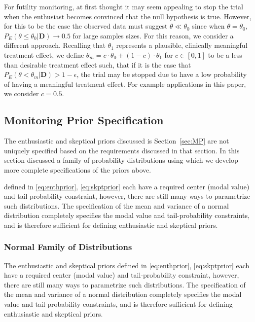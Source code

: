 \documentclass[12pt]{article}
\begin{document}
For futility monitoring, at first thought it may seem appealing to stop the trial when the enthusiast becomes convinced that the
null hypothesis is true. 
%
However, for this to be the case the observed data must suggest $\theta \ll \theta_0$ since when $\theta=\theta_0$,
$P_E(\theta\le\theta_0| \mathbf{D}) \rightarrow 0.5$ for large samples sizes.
%
For this reason, we consider a different approach.
%
Recalling that $\theta_1$ represents a plausible, clinically meaningful treatment effect, we define $\theta_{m}= c \cdot \theta_0 + (1-c) \cdot \theta_1$ for 
$c \in [0,1]$ to be a less than desirable treatment effect such, that if it is the case that $P_E\left(\theta<\theta_{m}\Big| \mathbf{D}\right)>1-\epsilon$, 
the trial may be stopped due to have a low probability of having a meaningful treatment effect.
%
For example applications in this paper, we consider $c=0.5$.

\subsection{Monitoring Prior Specification}

The enthusiastic and skeptical priors discussed is Section~\ref{sec:MP} are not uniquely specified based on the requirements discussed in that section. 
%
In this section discussed a family of probability distributions using which we develop more complete 
specifications of the priors above.


defined in \eqref{eq:enthprior}, \eqref{eq:skptprior} each have a required 
center (modal value) and tail-probability constraint, however, there are still many ways to parametrize such distributions. 
%
The specification of the mean and variance of a normal distribution completely specifies the modal value and tail-probability constraints, and is therefore sufficient for defining enthusiastic and skeptical priors.



\subsubsection{Normal Family of Distributions}
The enthusiastic and skeptical priors defined in \eqref{eq:enthprior}, \eqref{eq:skptprior} each have a required 
center (modal value) and tail-probability constraint, however, there are still many ways to parametrize such distributions. 
%
The specification of the mean and variance of a normal distribution completely specifies the modal value and tail-probability constraints, and is therefore sufficient for defining enthusiastic and skeptical priors.
\end{document}
